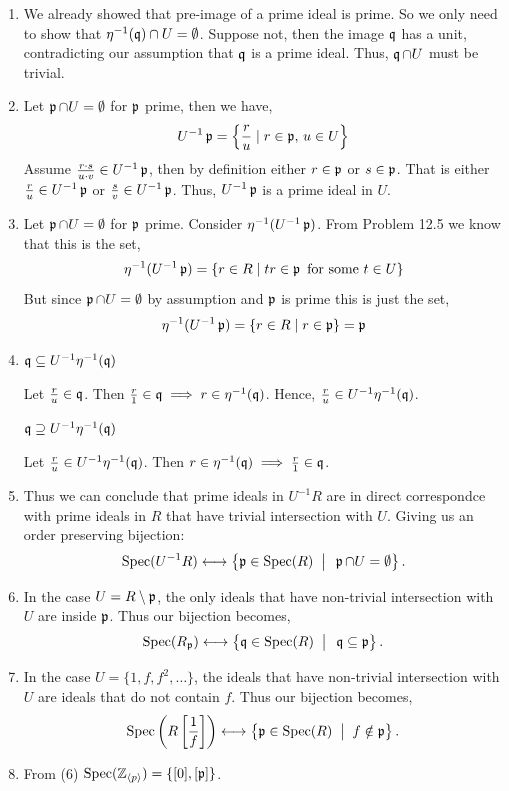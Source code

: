 \documentclass[Notebook.tex]{subfiles}
\begin{document}
\begin{solution}
	\bbni
	\begin{enumerate}
		\item We already showed that pre-image of a prime ideal is prime. So we only need to show that $\eta^{-1}(\operatorname{\mathfrak{q}}) \cap U = \emptyset$. Suppose not, then the image $\operatorname{\mathfrak{q}}$ has a unit, contradicting our assumption that $\operatorname{\mathfrak{q}}$ is a prime ideal. Thus, $\operatorname{\mathfrak{q}} \cap U$ must be trivial. 
		
		\item Let $\operatorname{\mathfrak{p}} \cap U = \emptyset$ for $\operatorname{\mathfrak{p}}$ prime, then we have, 
		\[U^{-1}\operatorname{\mathfrak{p}} = \left\{ \frac{r}{u} \mid r \in \operatorname{\mathfrak{p}} , \, u \in U\right\}\]
		Assume $\frac{r \cdot s}{u\cdot v} \in U^{-1}\operatorname{\mathfrak{p}}$, then by definition either $r \in \operatorname{\mathfrak{p}}$ or $s \in \operatorname{\mathfrak{p}}$. That is either $\frac{r}{u} \in U^{-1}\operatorname{\mathfrak{p}}$ or $\frac{s}{v} \in U^{-1}\operatorname{\mathfrak{p}}$. Thus, $U^{-1}\operatorname{\mathfrak{p}}$ is a prime ideal in $U$. 

		\item Let $\operatorname{\mathfrak{p}} \cap U = \emptyset$ for $\operatorname{\mathfrak{p}}$ prime. Consider $\eta^{-1}(U^{-1}\operatorname{\mathfrak{p}})$. From Problem 12.5 we know that this is the set, 
		\[\eta^{-1}(U^{-1}\operatorname{\mathfrak{p}}) = \{r \in R \mid tr \in \operatorname{\mathfrak{p}} \text{ for some } t \in U\}\]
		But since $\operatorname{\mathfrak{p}} \cap U = \emptyset$ by assumption and $\operatorname{\mathfrak{p}}$ is prime this is just the set, 
		\[\eta^{-1}(U^{-1}\operatorname{\mathfrak{p}}) = \{r \in R \mid r \in \operatorname{\mathfrak{p}} \} = \operatorname{\mathfrak{p}}\]

		\item $\operatorname{\mathfrak{q}} \subseteq U^{-1}\eta^{-1}(\operatorname{\mathfrak{q}})$ 
		
		Let $\frac{r}{u} \in \operatorname{\mathfrak{q}}$. Then $\frac{r}{1} \in \operatorname{\mathfrak{q}} \implies r \in \eta^{-1}(\operatorname{\mathfrak{q}})$. Hence, $\frac{r}{u} \in U^{-1}\eta^{-1} (\operatorname{\mathfrak{q}})$. 

		$\operatorname{\mathfrak{q}} \supseteq U^{-1}\eta^{-1}(\operatorname{\mathfrak{q}})$ 
		
		Let $\frac{r}{u} \in U^{-1}\eta^{-1}(\operatorname{\mathfrak{q}})$. Then $r \in \eta^{-1}(\operatorname{\mathfrak{q}}) \implies \frac{r}{1} \in \operatorname{\mathfrak{q}}$. 


		\item Thus we can conclude that prime ideals in $U^{-1}R$ are in direct correspondce with prime ideals in $R$ that have trivial intersection with $U$. Giving us an order preserving bijection: 
		\[
		\operatorname{Spec}(U^{-1}R)
		\longleftrightarrow
		\left\{\operatorname{\mathfrak{p}}\in \operatorname{Spec}(R)\;\; \big|\;\; \operatorname{\mathfrak{p}}\cap U=\emptyset\right\}.
		\]	

		\item In the case $U = R \setminus \operatorname{\mathfrak{p}}$, the only ideals that have non-trivial intersection with $U$ are inside $\operatorname{\mathfrak{p}}$. Thus our bijection becomes, 
		\[
		\operatorname{Spec}(R_{\operatorname{\mathfrak{p}}})
		\longleftrightarrow
		\left\{\operatorname{\mathfrak{q}}\in \operatorname{Spec}(R)\;\; \big|\;\; \operatorname{\mathfrak{q}} \subseteq \operatorname{\mathfrak{p}} \right\}.
		\]	

		\item In the case $U = \{1, f, f^2, \ldots\}$, the ideals that have non-trivial intersection with $U$ are ideals that do not contain $f$. Thus our bijection becomes, 
		\[
		\operatorname{Spec}\left(R\left[\frac{1}{f}\right]\right)
		\longleftrightarrow
		\left\{\operatorname{\mathfrak{p}}\in \operatorname{Spec}(R)\;\; \big|\;\; f \notin \operatorname{\mathfrak{p}} \right\}.
		\]	
		
		\item From (6)  $\operatorname{Spec}(\mathbb Z_{\langle p \rangle}) = \left\{[0], [\operatorname{\mathfrak{p}}]\right\}$. 
	\end{enumerate}
\end{solution}
\end{document}
